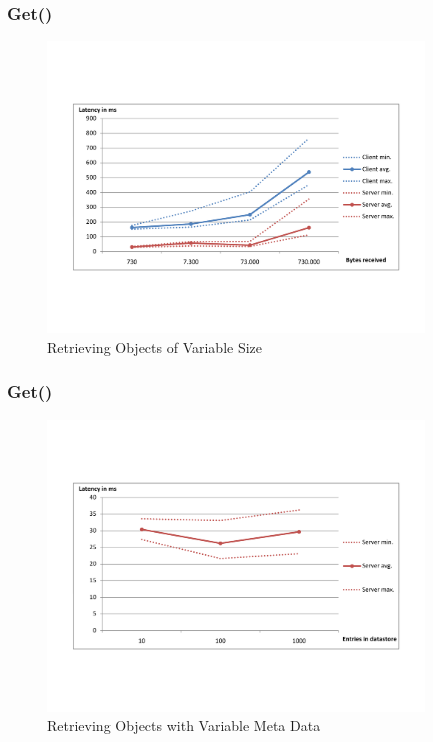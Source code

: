 \documentclass{beamer}
\begin{document}
\frame
{
	\frametitle{Get()}
	\begin{figure}[t]
	\begin{center}
	\includegraphics[trim = 0 5cm 0 5cm, width=10cm]{get_obj.pdf} 
	\caption{Retrieving Objects of Variable Size}
	\end{center}
	\end{figure}
}

\frame
{
	\frametitle{Get()}
	\begin{figure}[t]
	\begin{center}
	\includegraphics[trim = 0 5cm 0 5cm, width=10cm]{get_amt.pdf} 
	\caption{Retrieving Objects with Variable Meta Data}
	\end{center}
	\end{figure}
}
\end{document}
